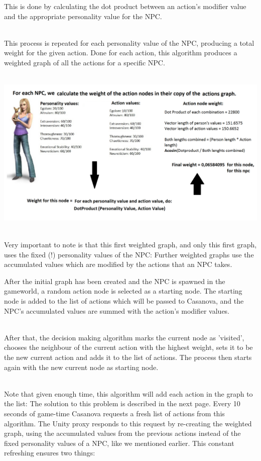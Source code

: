 \documentclass[11pt]{article} %
\begin{document}
\newpage
This is done by calculating the dot product between an action's modifier value and the appropriate personality value for the NPC. 

~\\
This process is repeated for each personality value of the NPC, producing a total weight for the given action. Done for each action, this algorithm produces a weighted graph of all the actions for a specific NPC.


~\\
\includegraphics[scale=0.4]{FillingAlgorithm}


~\\
Very important to note is that this first weighted graph, and only this first graph, uses the fixed (!) personality values of the NPC: Further weighted graphs use the accumulated values which are modified by the actions that an NPC takes.


\newpage
After the initial graph has been created and the NPC is spawned in the gameworld, a random action node is selected as a starting node. The starting node is added to the list of actions which will be passed to Casanova, and the NPC's accumulated values are summed with the action's modifier values. 



~\\
After that, the decision making algorithm marks the current node as 'visited', chooses the neighbour of the current action with the highest weight, sets it to be the new current action and adds it to the list of actions. The process then starts again with the new current node as starting node. 

~\\
Note that given enough time, this algorithm will add each action in the graph to the list: The solution to this problem is described in the next page.
\newpage
Every 10 seconds of game-time Casanova requests a fresh list of actions from this algorithm. The Unity proxy responds to this request by re-creating the weighted graph, using the accumulated values from the previous actions instead of the fixed personality values of a NPC, like we mentioned earlier. This constant refreshing ensures two things: 
\end{document}
